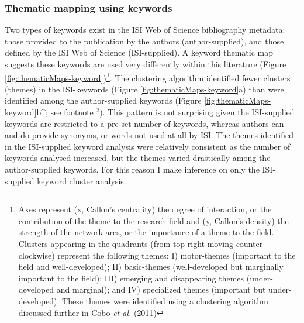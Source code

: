 \documentclass[print]{nuthesis}
\begin{document}
\hypertarget{thematic-mapping-using-keywords}{%
\subsubsection{Thematic mapping using keywords}\label{thematic-mapping-using-keywords}}

Two types of keywords exist in the ISI Web of Science bibliography metadata: those provided to the publication by the authors (author-supplied), and those defined by the ISI Web of Science (ISI-supplied). A keyword thematic map suggests these keywords are used very differently within this literature (Figure \ref{fig:thematicMaps-keyword})\footnote{Axes represent (x, Callon's centrality) the degree of interaction, or the contribution of the theme to the research field and (y, Callon's density) the strength of the network arcs, or the importance of a theme to the field. Clusters appearing in the quadrants (from top-right moving counter-clockwise) represent the following themes: I) motor-themes (important to the field and well-developed); II) basic-themes (well-developed but marginally important to the field); III) emerging and disappearing themes (under-developed and marginal); and IV) specialized themes (important but under-developed). These themes were identified using a clustering algorithm discussed further in Cobo \emph{et al.} (\protect\hyperlink{ref-cobo2011approach}{2011})}. The clustering algorithm identified fewer clusters (themes) in the ISI-keywords (Figure \ref{fig:thematicMaps-keyword}a) than were identified among the author-supplied keywords (Figure \ref{fig:thematicMaps-keyword}b\^{}; see footnote \(^2\)). This pattern is not surprising given the ISI-supplied keywords are restricted to a pre-set number of keywords, whereas authors can and do provide synonyms, or words not used at all by ISI. The themes identified in the ISI-supplied keyword analysis were relatively consistent as the number of keywords analysed increased, but the themes varied drastically among the author-supplied keywords. For this reason I make inference on only the ISI-supplied keyword cluster analysis.
\end{document}
